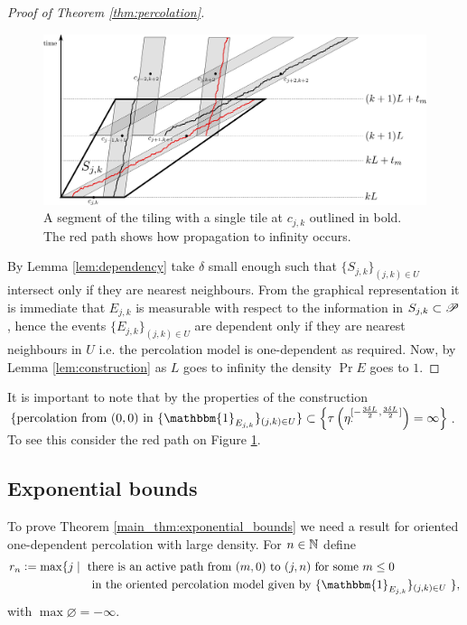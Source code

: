 \begin{proof}[Proof of Theorem \ref{thm:percolation}]
\begin{figure}[!h]
  \includegraphics[width=\linewidth]{construction_tiling}
  \caption{A segment of the tiling with a single tile at $c_{j, k}$ outlined in bold. The red path shows how propagation to infinity occurs. }
  \label{fig:construction_tiling}
\end{figure}
By Lemma \ref{lem:dependency} take $\delta$ small enough such that $\{S_{j,k}\}_{(j,k) \in U}$ intersect only if they are nearest neighbours. From the graphical representation it is immediate that $E_{j,k}$ is measurable with respect to the information in $S_{j,k} \subset \mathscr{P}$, hence the events $\{E_{j,k}\}_{(j,k) \in U}$ are dependent only if they are nearest neighbours in $U$ i.e. the percolation model is one-dependent as required. Now, by Lemma \ref{lem:construction} as $L$ goes to infinity the density $\Pr{E}$ goes to $1$. 
\end{proof}
\begin{remark}
It is important to note that by the properties of the construction \newline $\{\text{percolation from $(0,0)$ in $\{\mathbbm{1}_{E_{j,k}}\}_{(j,k) \in U}$}\} \subset \left\{ \tau\left(\eta^{[- \frac{3 \delta L}{2}, \frac{3 \delta L}{2}]}_\cdot \right) = \infty \right\}$. To see this consider the red path on Figure \ref{fig:construction_tiling}. 
\end{remark}

\subsection{Exponential bounds}

To prove Theorem \ref{main_thm:exponential_bounds} we need a result for oriented one-dependent percolation with large density. For $n \in \mathbb{N}$ define 
\begin{align*}
r_n &\defeq \max\{j \mid \text{ there is an active path from $(m,0)$ to $(j,n)$ for some $m\leq 0$} \\ \nonumber&\qquad\qquad\qquad \text{in the oriented percolation model given by $\{\mathbbm{1}_{E_{j,k}}\}_{(j,k) \in U}$ }\}, 
\end{align*}
with $\max \varnothing = - \infty$. 

